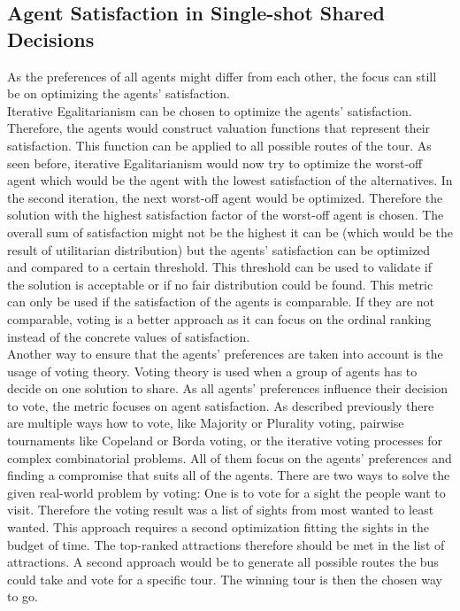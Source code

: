 \documentclass[german, a4paper, 11pt, oneside]{scrbook}
\begin{document}
\subsection{Agent Satisfaction in Single-shot Shared Decisions}
As the preferences of all agents might differ from each other, the focus can still be on optimizing the agents' satisfaction. 
\\Iterative Egalitarianism can be chosen to optimize the agents' satisfaction. Therefore, the agents would construct valuation functions that represent their satisfaction. This function can be applied to all possible routes of the tour. As seen before, iterative Egalitarianism would now try to optimize the worst-off agent which would be the agent with the lowest satisfaction of the alternatives. In the second iteration, the next worst-off agent would be optimized. Therefore the solution with the highest satisfaction factor of the worst-off agent is chosen. The overall sum of satisfaction might not be the highest it can be (which would be the result of utilitarian distribution) but the agents' satisfaction can be optimized and compared to a certain threshold. This threshold can be used to validate if the solution is acceptable or if no fair distribution could be found. This metric can only be used if the satisfaction of the agents is comparable. If they are not comparable, voting is a better approach as it can focus on the ordinal ranking instead of the concrete values of satisfaction.
\\Another way to ensure that the agents' preferences are taken into account is the usage of voting theory. Voting theory is used when a group of agents has to decide on one solution to share. As all agents' preferences influence their decision to vote, the metric focuses on agent satisfaction. As described previously there are multiple ways how to vote, like Majority or Plurality voting, pairwise tournaments like Copeland or Borda voting, or the iterative voting processes for complex combinatorial problems. All of them focus on the agents' preferences and finding a compromise that suits all of the agents. There are two ways to solve the given real-world problem by voting: One is to vote for a sight the people want to visit. Therefore the voting result was a list of sights from most wanted to least wanted. This approach requires a second optimization fitting the sights in the budget of time. The top-ranked attractions therefore should be met in the list of attractions. A second approach would be to generate all possible routes the bus could take and vote for a specific tour. The winning tour is then the chosen way to go.
\end{document}
